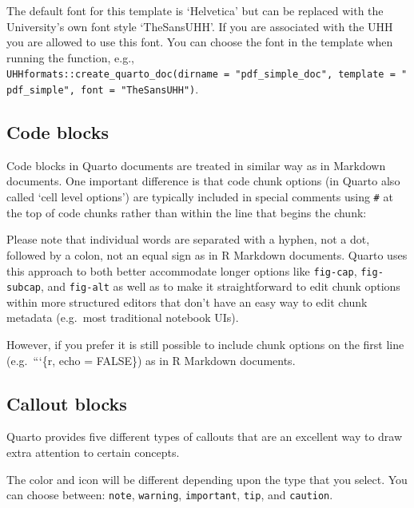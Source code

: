 \documentclass[
  letterpaper,
  DIV=11,
  numbers=noendperiod]{scrartcl}
\begin{document}
The default font for this template is `Helvetica' but can be replaced
with the University's own font style `TheSansUHH'. If you are associated
with the UHH you are allowed to use this font. You can choose the font
in the template when running the function, e.g.,
\texttt{UHHformats::create\_quarto\_doc(dirname\ =\ "pdf\_simple\_doc",\ template\ =\ "pdf\_simple",\ font\ =\ "TheSansUHH")}.

\subsection{Code blocks}\label{code-blocks}

Code blocks in Quarto documents are treated in similar way as in
Markdown documents. One important difference is that code chunk options
(in Quarto also called `cell level options') are typically included in
special comments using \texttt{\#\textbar{}} at the top of code chunks
rather than within the line that begins the chunk:

Please note that individual words are separated with a hyphen, not a
dot, followed by a colon, not an equal sign as in R Markdown documents.
Quarto uses this approach to both better accommodate longer options like
\texttt{fig-cap}, \texttt{fig-subcap}, and \texttt{fig-alt} as well as
to make it straightforward to edit chunk options within more structured
editors that don't have an easy way to edit chunk metadata (e.g.~most
traditional notebook UIs).

However, if you prefer it is still possible to include chunk options on
the first line (e.g.~```\{r, echo = FALSE\}) as in R Markdown documents.

\subsection{Callout blocks}\label{callout-blocks}

Quarto provides five different types of callouts that are an excellent
way to draw extra attention to certain concepts.

\begin{tcolorbox}[enhanced jigsaw, toprule=.15mm, colbacktitle=quarto-callout-note-color!10!white, colback=white, rightrule=.15mm, left=2mm, title=\textcolor{quarto-callout-note-color}{\faInfo}\hspace{0.5em}{Note}, colframe=quarto-callout-note-color-frame, breakable, bottomtitle=1mm, opacitybacktitle=0.6, opacityback=0, bottomrule=.15mm, arc=.35mm, coltitle=black, leftrule=.75mm, toptitle=1mm, titlerule=0mm]

The color and icon will be different depending upon the type that you
select. You can choose between: \texttt{note}, \texttt{warning},
\texttt{important}, \texttt{tip}, and \texttt{caution}.

\end{tcolorbox}
\end{document}
